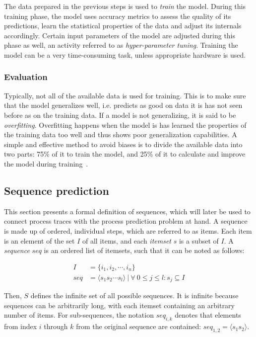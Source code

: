 The data prepared in the previous steps is used to \textit{train} the model. During this training phase, the model uses accuracy metrics to assess the quality of its predictions, learn the statistical properties of the data and adjust its internals accordingly. Certain input parameters of the model are adjusted during this phase as well, an activity referred to as \textit{hyper-parameter tuning}. Training the model can be a very time-consuming task, unless appropriate hardware is used.

\subsubsection*{Evaluation}
Typically, not all of the available data is used for training. This is to make sure that the model generalizes well, i.e. predicts as good on data it is has not seen before as on the training data. If a model is not generalizing, it is said to be \textit{overfitting}. Overfitting happens when the model is has learned the properties of the training data too well and thus shows poor generalization capabilities. A simple and effective method to avoid biases is to divide the available data into two parts: 75\% of it to train the model, and 25\% of it to calculate and improve the model during training~\cite{kuhn2013applied, trevor2009elements}.

\subsection{Sequence prediction}\label{sec:background:sequence-prediction}
This section presents a formal definition of sequences, which will later be used to connect process traces with the process prediction problem at hand. A sequence is made up of ordered, individual steps, which are referred to as items. Each item is an element of the set $I$ of all items, and each \textit{itemset} $s$ is a subset of $I$. A \textit{sequence} $seq$ is an ordered list of itemsets, such that it can be noted as follows:

\begin{equation*}
\begin{split}
  I &= \{i_1, i_2, \cdots, i_n\}\\
seq &= \langle s_1s_2\cdots s_l \rangle\ |\ \forall\ 0 \leq j \leq l: s_j \subseteq I
\end{split}
\end{equation*}

Then, $S$ defines the infinite set of all possible sequences. It is infinite because sequences can be arbitrarily long, with each itemset containing an arbitrary number of items. For  sub-sequences, the notation $seq_{i,k}$ denotes that elements from index $i$ through $k$ from the original sequence are contained: $seq_{1,2} = \langle s_1s_2 \rangle$.\\

